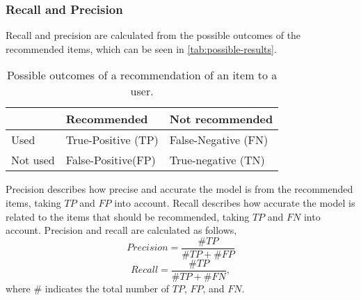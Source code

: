\subsubsection{Recall and Precision}
Recall and precision are calculated from the possible outcomes of the recommended items, which can be seen in \autoref{tab:possible-results}.
\begin{table}[]
    \centering
    \begin{tabular}{|l|l|l|}
        \hline
        \rowcolor[HTML]{FFFFFF}
                 & Recommended        & Not recommended     \\ \hline
        Used     & True-Positive (TP) & False-Negative (FN) \\ \hline
        Not used & False-Positive(FP) & True-negative (TN)  \\ \hline
    \end{tabular}
    \caption{Possible outcomes of a recommendation of an item to a user.}
    \label{tab:possible-results}
\end{table}
Precision describes how precise and accurate the model is from the recommended items, taking $TP$ and $FP$ into account.
Recall describes how accurate the model is related to the items that should be recommended, taking $TP$ and $FN$ into account.
Precision and recall are calculated as follows,
\begin{equation}
    Precision = \frac{\#TP}{\#TP + \# FP}
\end{equation}
\begin{equation}
    Recall = \frac{\#TP}{\#TP + \# FN},
\end{equation}
where \# indicates the total number of $TP$, $FP$, and $FN$.
